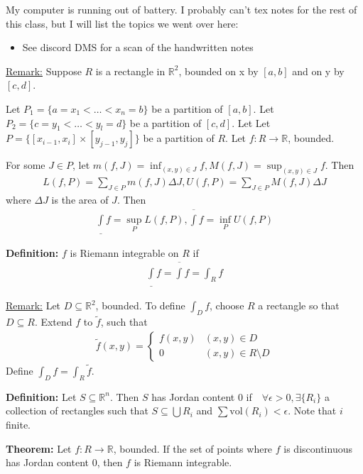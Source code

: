 \documentclass{article}
\newcommand*{\txt}[1]{\text{ #1 }}%
\newcommand*{\fora}{\txt{}\forall}%
\newcommand*{\rr}{\mathbb{R}}%
\begin{document}
My computer is running out of battery. I probably can't tex notes for the rest of this class, but I will list the topics we went over here:\begin{itemize}
    \item See discord DMS for a scan of the handwritten notes 
\end{itemize}

\underline{Remark:} Suppose $R$ is a rectangle in $\rr^2$, bounded on x by $[a,b]$ and on y by $[c,d]$.

Let $P_1=\{a=x_1<\dots<x_n=b\}$ be a partition of $[a,b]$. Let $P_2=\{c=y_1<\dots<y_l=d\}$ be a partition of $[c,d]$. Let Let $P=\{[x_{i-1},x_i]\times [y_{j-1},y_j]\}$ be a partition of $R$. Let $f:R\to \rr$, bounded. 

For some $J\in P$, let $m(f, J)=\inf_{(x,y)\in J}f, M(f,J)=\sup_{(x,y)\in J}f$. Then \begin{align*}
    L(f,P)=\sum_{J\in P}m(f,J)\Delta J, U(f,P)=\sum_{J\in P}M(f,J)\Delta J
\end{align*}where $\Delta J$ is the area of $J$. Then \begin{align*}
    \underline{\int}f = \sup_{P}L(f,P), \overline{\int}f=\inf_{P}U(f,P)
\end{align*}

\textbf{Definition:} $f$ is Riemann integrable on $R$ if \begin{align*}
    \underline{\int}f=\overline{\int}f=\int_R f
\end{align*}

\underline{Remark:} Let $D\subseteq \rr^2$, bounded. To define $\int_D f$, choose $R$ a rectangle so that $D\subseteq R$. Extend $f$ to $\tilde{f}$, such that \begin{align*}
    \tilde{f}(x,y)=\begin{cases}
        f(x,y) & (x,y)\in D\\
        0 & (x,y)\in R\setminus D
    \end{cases}
\end{align*}Define $\int_D f=\int_R \tilde{f}$.

\textbf{Definition:} Let $S\subseteq \rr^n$. Then $S$ has Jordan content 0 if $\fora \epsilon>0, \exists \{R_i\}$ a collection of rectangles such that $S\subseteq \bigcup R_i$ and $\sum \text{vol}(R_i)<\epsilon$. Note that $i$ finite. 

\textbf{Theorem:} Let $f:R\to \rr$, bounded. If the set of points where $f$ is discontinuous has Jordan content 0, then $f$ is Riemann integrable.
\end{document}
